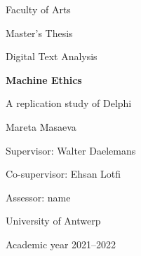 \thispagestyle{plain}
    \begin{center}
    
        \vspace*{1cm}

        \large
        Faculty of Arts
        
        \vspace{0.5cm}
        Master’s Thesis 
        
        \vspace{0.5cm}
        Digital Text Analysis 
        
       \vspace{1.5cm}
            
        \Huge
        \textbf{Machine Ethics}
            
        \vspace{0.5cm}
        \LARGE
        A replication study of Delphi
            
        \vspace{1.5cm}
        
        \Large    
        Mareta Masaeva
        
        \vspace{0.5cm}
        
        \large
        Supervisor: Walter Daelemans
        
        \vspace{0.5cm}
        Co-supervisor: Ehsan Lotfi
        
        \vspace{0.5cm}
        Assessor: name
        
        \vspace{1cm}
        University of Antwerp
        
        \vspace{1cm}   
        Academic year 2021–2022
            
    \end{center}